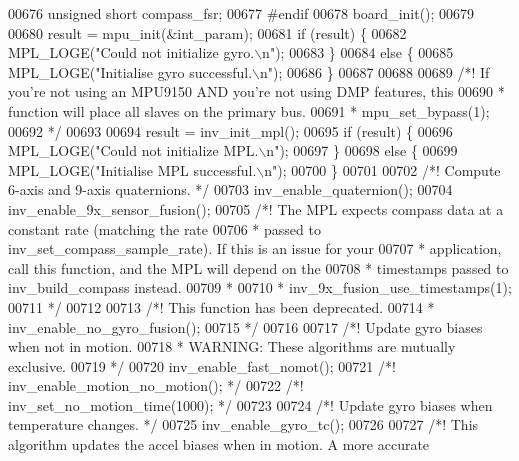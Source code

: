 \begin{DoxyCode}
{{{{{{{{00676     \textcolor{keywordtype}{unsigned} \textcolor{keywordtype}{short} compass\_fsr;
00677 \textcolor{preprocessor}{#}\textcolor{preprocessor}{endif}
00678     board_init();
00679 
00680   result = mpu\_init(&int\_param);
00681   \textcolor{keywordflow}{if} (result) \{
00682       MPL\_LOGE(\textcolor{stringliteral}{"Could not initialize gyro.\(\backslash\)n"});
00683   \}
00684   \textcolor{keywordflow}{else} \{
00685       MPL\_LOGE(\textcolor{stringliteral}{"Initialise gyro successful.\(\backslash\)n"});
00686     \}
00687 
00688 
00689     \textcolor{comment}{/*! If you're not using an MPU9150 AND you're not using DMP features, this}
00690 \textcolor{comment}{     * function will place all slaves on the primary bus.}
00691 \textcolor{comment}{     * mpu\_set\_bypass(1);}
00692 \textcolor{comment}{     */}
00693 
00694   result = inv\_init\_mpl();
00695   \textcolor{keywordflow}{if} (result) \{
00696       MPL\_LOGE(\textcolor{stringliteral}{"Could not initialize MPL.\(\backslash\)n"});
00697   \}
00698   \textcolor{keywordflow}{else} \{
00699       MPL\_LOGE(\textcolor{stringliteral}{"Initialise MPL successful.\(\backslash\)n"});
00700   \}
00701 
00702     \textcolor{comment}{/*! Compute 6-axis and 9-axis quaternions. */}
00703     inv\_enable\_quaternion();
00704     inv\_enable\_9x\_sensor\_fusion();
00705     \textcolor{comment}{/*! The MPL expects compass data at a constant rate (matching the rate}
00706 \textcolor{comment}{     * passed to inv\_set\_compass\_sample\_rate). If this is an issue for your}
00707 \textcolor{comment}{     * application, call this function, and the MPL will depend on the}
00708 \textcolor{comment}{     * timestamps passed to inv\_build\_compass instead.}
00709 \textcolor{comment}{     *}
00710 \textcolor{comment}{     * inv\_9x\_fusion\_use\_timestamps(1);}
00711 \textcolor{comment}{     */}
00712 
00713     \textcolor{comment}{/*! This function has been deprecated.}
00714 \textcolor{comment}{     * inv\_enable\_no\_gyro\_fusion();}
00715 \textcolor{comment}{     */}
00716 
00717     \textcolor{comment}{/*! Update gyro biases when not in motion.}
00718 \textcolor{comment}{     * WARNING: These algorithms are mutually exclusive.}
00719 \textcolor{comment}{     */}
00720     inv\_enable\_fast\_nomot();
00721     \textcolor{comment}{/*! inv\_enable\_motion\_no\_motion(); */}
00722     \textcolor{comment}{/*! inv\_set\_no\_motion\_time(1000); */}
00723 
00724     \textcolor{comment}{/*! Update gyro biases when temperature changes. */}
00725     inv\_enable\_gyro\_tc();
00726 
00727     \textcolor{comment}{/*! This algorithm updates the accel biases when in motion. A more accurate}
}}}}}}}}
\end{DoxyCode}
